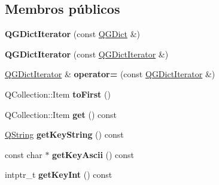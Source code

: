 \subsection*{Membros públicos}
\begin{DoxyCompactItemize}
\item 
\hypertarget{class_q_g_dict_iterator_a7debad45ca88a2170846c70da56d691f}{{\bfseries Q\-G\-Dict\-Iterator} (const \hyperlink{class_q_g_dict}{Q\-G\-Dict} \&)}\label{class_q_g_dict_iterator_a7debad45ca88a2170846c70da56d691f}

\item 
\hypertarget{class_q_g_dict_iterator_a8e78b5561f111d1a7cc6057b282d21dc}{{\bfseries Q\-G\-Dict\-Iterator} (const \hyperlink{class_q_g_dict_iterator}{Q\-G\-Dict\-Iterator} \&)}\label{class_q_g_dict_iterator_a8e78b5561f111d1a7cc6057b282d21dc}

\item 
\hypertarget{class_q_g_dict_iterator_a9547427c65f138e4fd962bfa8ce5b178}{\hyperlink{class_q_g_dict_iterator}{Q\-G\-Dict\-Iterator} \& {\bfseries operator=} (const \hyperlink{class_q_g_dict_iterator}{Q\-G\-Dict\-Iterator} \&)}\label{class_q_g_dict_iterator_a9547427c65f138e4fd962bfa8ce5b178}

\item 
\hypertarget{class_q_g_dict_iterator_adcebe55449ce6d00c152205e52d85afe}{Q\-Collection\-::\-Item {\bfseries to\-First} ()}\label{class_q_g_dict_iterator_adcebe55449ce6d00c152205e52d85afe}

\item 
\hypertarget{class_q_g_dict_iterator_a8980e2ae172d1c2e71f5471948fd5524}{Q\-Collection\-::\-Item {\bfseries get} () const }\label{class_q_g_dict_iterator_a8980e2ae172d1c2e71f5471948fd5524}

\item 
\hypertarget{class_q_g_dict_iterator_a06066de94a84348694415bdc5bd7d82e}{\hyperlink{class_q_string}{Q\-String} {\bfseries get\-Key\-String} () const }\label{class_q_g_dict_iterator_a06066de94a84348694415bdc5bd7d82e}

\item 
\hypertarget{class_q_g_dict_iterator_a9da3c65e79e4462b4d2dac6af639d060}{const char $\ast$ {\bfseries get\-Key\-Ascii} () const }\label{class_q_g_dict_iterator_a9da3c65e79e4462b4d2dac6af639d060}

\item 
\hypertarget{class_q_g_dict_iterator_aa45104c0020de0b4fee02de5263e8b81}{intptr\-\_\-t {\bfseries get\-Key\-Int} () const }\label{class_q_g_dict_iterator_aa45104c0020de0b4fee02de5263e8b81}


\end{DoxyCompactItemize}
